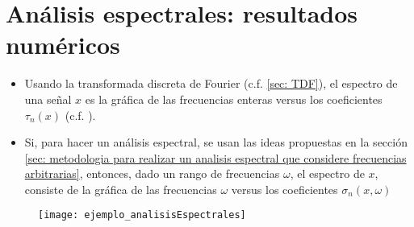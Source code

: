 \chapter{Análisis espectrales: resultados numéricos}

\begin{itemize}
	\item Usando la transformada discreta de Fourier
	(c.f. \ref{sec: TDF}), el espectro de
	una señal $x$ es la gráfica de las frecuencias
	enteras 
	versus los coeficientes
	$\tau_{n}(x)$ (c.f. ).
	
	\item Si, para hacer un análisis espectral, se usan
	las ideas propuestas en 
	la sección
	\ref{sec: metodologia para realizar un analisis espectral que considere frecuencias arbitrarias}, entonces, dado un rango de frecuencias 
	$\omega$,
	el espectro de $x$, consiste de la gráfica de 
	las frecuencias $\omega$ versus	
	los coeficientes
	$\sigma_{n}(x, \omega)$ 
\end{itemize}


\begin{figure}[H]
	\centering
	\texttt{[image: ejemplo\_analisisEspectrales]} 
\end{figure}	